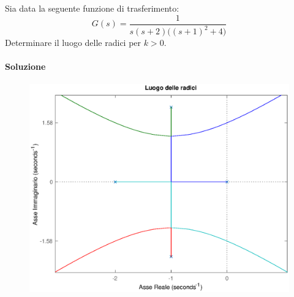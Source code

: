 \exercise{}
Sia data la seguente funzione di trasferimento:
\[
	G(s) = \frac{1}{s(s+2)\bigl( (s+1)^2 +4 \bigr)}
\]
Determinare il luogo delle radici per \(k>0\).

\paragraph{Soluzione}

\begin{figure}[ht]
	\centering
	\includegraphics[scale=.6]{mod1/assets/rl_ex37}
\end{figure}


